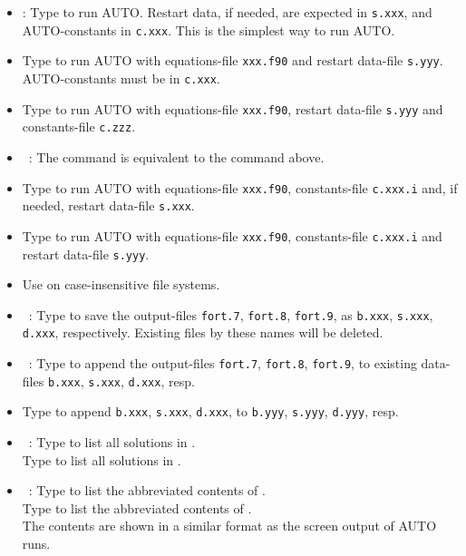 \documentclass[12pt]{report}
\begin{document}
\begin{itemize}
\item[\tt @r]:
  Type  to run {\cal AUTO}.
  Restart data, if needed, are expected in {\tt s.xxx},
  and {\cal AUTO}-constants in {\tt c.xxx}.
  This is the simplest way to run {\cal AUTO}.
\item[-]
  Type  to run {\cal AUTO}
  with equations-file {\tt xxx.f90} and restart data-file {\tt s.yyy}.
  {\cal AUTO}-constants must be in {\tt c.xxx}.
\item[-]
  Type  to run {\cal AUTO}
  with equations-file {\tt xxx.f90}, restart data-file {\tt s.yyy}
  and constants-file {\tt c.zzz}.

\item[\tt @R]~:
  The command  is equivalent to the command  above.
\item[-]
  Type   to run {\cal AUTO} with equations-file {\tt xxx.f90},
  constants-file {\tt c.xxx.i}
  and, if needed, restart data-file {\tt s.xxx}. 
\item[-]
  Type  to run {\cal AUTO}
  with equations-file {\tt xxx.f90}, 
  constants-file {\tt c.xxx.i}
  and restart data-file {\tt s.yyy}.
\item[-]
  Use  on case-insensitive file systems.

\item[\tt @sv]~:
  Type  to save the output-files 
  {\tt fort.7}, {\tt fort.8}, {\tt fort.9},
  as {\tt b.xxx}, {\tt s.xxx}, {\tt d.xxx}, respectively.
  Existing files by these names will be deleted.

\item[\tt @ap]~:
  Type  to append the output-files 
  {\tt fort.7}, {\tt fort.8}, {\tt fort.9}, 
  to existing data-files 
  {\tt b.xxx}, {\tt s.xxx}, {\tt d.xxx}, resp.
\item[-]
  Type  
  to append 
  {\tt b.xxx}, {\tt s.xxx}, {\tt d.xxx}, to
  {\tt b.yyy}, {\tt s.yyy}, {\tt d.yyy}, resp.

\item[\tt @ll]~:
  Type  to list all solutions in .\\
  Type  to list all solutions in .

\item[\tt @ls]~:
  Type  to list the abbreviated contents of .\\
  Type  to list the abbreviated contents of .\\
  The contents are shown in a similar format as the screen output of
  AUTO runs.


\end{itemize}
\end{document}
